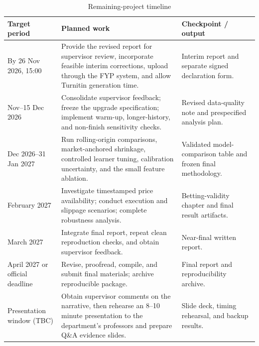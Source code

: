 \begin{table}[htbp]
\centering
\caption{Remaining-project timeline}\label{tab:timeline}
\small
\begin{tabularx}{\textwidth}{L{3.2cm} Y L{4.1cm}}
\toprule
\textbf{Target period} & \textbf{Planned work} & \textbf{Checkpoint / output} \\
\midrule
By 26 Nov 2026, 15:00 & Provide the revised report for supervisor review, incorporate feasible interim corrections, upload through the FYP system, and allow Turnitin generation time. & Interim report and separate signed declaration form. \\
 Nov--15 Dec 2026 & Consolidate supervisor feedback; freeze the upgrade specification; implement warm-up, longer-history, and non-finish sensitivity checks. & Revised data-quality note and prespecified analysis plan. \\
 Dec 2026--31 Jan 2027 & Run rolling-origin comparisons, market-anchored shrinkage, controlled learner tuning, calibration uncertainty, and the small feature ablation. & Validated model-comparison table and frozen final methodology. \\
\addlinespace
February 2027 & Investigate timestamped price availability; conduct execution and slippage scenarios; complete robustness analysis. & Betting-validity chapter and final result artifacts. \\
\addlinespace
March 2027 & Integrate final report, repeat clean reproduction checks, and obtain supervisor feedback. & Near-final written report. \\
\addlinespace
April 2027 or official deadline & Revise, proofread, compile, and submit final materials; archive reproducible package. & Final report and reproducibility archive. \\
\addlinespace
Presentation window (TBC) & Obtain supervisor comments on the narrative, then rehearse an 8--10 minute presentation to the department's professors and prepare Q\&A evidence slides. & Slide deck, timing rehearsal, and backup results. \\
\bottomrule
\end{tabularx}
\end{table}

